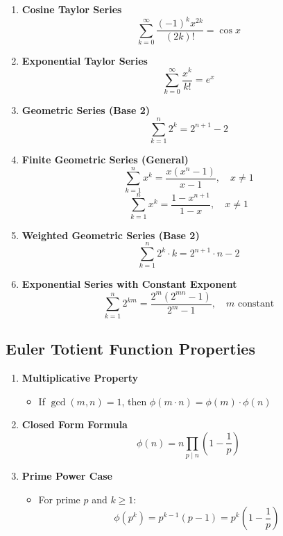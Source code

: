 \documentclass[twoside]{article}
\begin{document}
\begin{multicols*}{2}
\begin{enumerate}[leftmargin=*]
    \item \textbf{Cosine Taylor Series}
        \[\sum_{k = 0}^\infty \frac{(-1)^k x^{2k}}{(2k)!} = \cos x\]
    
    \item \textbf{Exponential Taylor Series}
        \[\sum_{k = 0}^\infty \frac{x^k}{k!} = e^x\]
    
    \item \textbf{Geometric Series (Base 2)}
        \[\sum_{k=1}^n 2^k = 2^{n+1} - 2\]
    
    \item \textbf{Finite Geometric Series (General)}
        \[\sum_{k=1}^n x^k = \frac{x(x^n - 1)}{x - 1}, \quad x \neq 1\]
        \[\sum_{k=1}^n x^k = \frac{1 - x^{n+1}}{1 - x}, \quad x \neq 1\]
    
    \item \textbf{Weighted Geometric Series (Base 2)}
        \[\sum_{k=1}^n 2^k \cdot k = 2^{n+1} \cdot n - 2\]
    
    \item \textbf{Exponential Series with Constant Exponent}
        \[\sum_{k=1}^n 2^{km} = \frac{2^m(2^{mn} - 1)}{2^m - 1}, \quad m \text{ constant}\]
\end{enumerate}

{
\subsection*{Euler Totient Function Properties}
}
\begin{enumerate}[leftmargin=*]
    \item \textbf{Multiplicative Property}
        \begin{itemize}
            \item If $\gcd(m, n) = 1$, then $\phi(m \cdot n) = \phi(m) \cdot \phi(n)$
        \end{itemize}
    
    \item \textbf{Closed Form Formula}
        \[\phi(n) = n\prod_{p \mid n}\left(1 - \frac{1}{p}\right)\]
    
    \item \textbf{Prime Power Case}
        \begin{itemize}
            \item For prime $p$ and $k \geq 1$:
            \[\phi(p^k) = p^{k-1}(p-1) = p^k\left(1 - \frac{1}{p}\right)\]
        \end{itemize}
    

\end{enumerate}
\end{multicols*}
\end{document}
